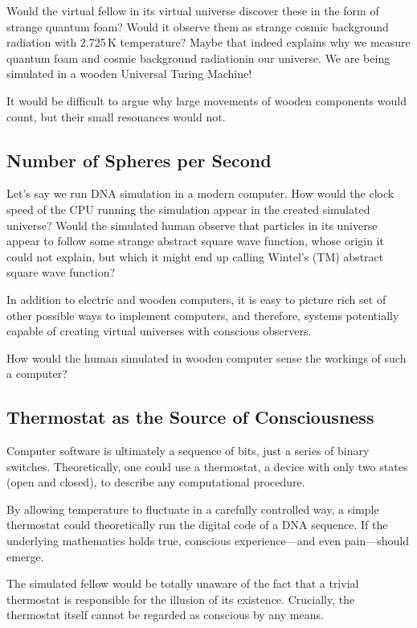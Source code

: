 Would the virtual fellow in its virtual universe discover these in the form of strange quantum foam? Would it observe them as strange cosmic background radiation with 2.725\,K temperature? Maybe that 
indeed explains why we measure quantum foam and cosmic background radiationin our universe. We are being simulated in a wooden Universal Turing Machine!

It would be difficult to argue why large movements of wooden components would count, but their small resonances would not.

\subsection*{Number of Spheres per Second}

Let's say we run DNA simulation in a modern computer. How would the clock speed of the CPU running the simulation appear in the created simulated universe?
Would the simulated human observe that particles in its universe appear to follow some strange abstract square wave function, whose origin it could not explain, 
but which it might end up calling Wintel's (TM) abstract square wave function?

In addition to electric and wooden computers, it is easy to picture rich set of other possible ways to implement computers, and therefore,
systems potentially capable of creating virtual universes with conscious observers.

How would the human simulated in wooden computer sense the workings of such a computer? 


\subsection*{Thermostat as the Source of Consciousness}

Computer software is ultimately a sequence of bits, just a series of binary switches. 
Theoretically, one could use a thermostat, a device with only two states (open and closed), to describe any computational procedure.

By allowing temperature to fluctuate in a carefully controlled way, a simple thermostat could theoretically run the digital code of a DNA sequence. If the underlying mathematics holds true, conscious experience—and even pain—should emerge.

The simulated fellow would be totally unaware of the fact that a trivial thermostat is responsible for the illusion of its existence.
Crucially, the thermostat itself cannot be regarded as conscious by any means. 

